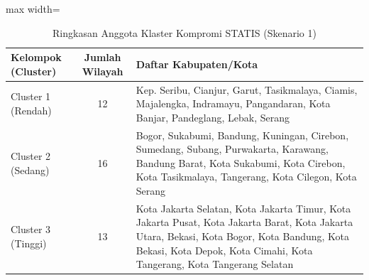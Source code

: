 \begin{table}[H]
\centering
\caption{Ringkasan Anggota Klaster Kompromi STATIS (Skenario 1)} \label{tab:app1compromclust}
\begin{adjustbox}{max width=\textwidth}
\begin{tabular}{|p{3cm}|c|p{10cm}|}
\hline
\textbf{Kelompok (Cluster)} & \textbf{Jumlah Wilayah} & \textbf{Daftar Kabupaten/Kota} \\
\hline
Cluster 1 (Rendah) & 12 & Kep. Seribu, Cianjur, Garut, Tasikmalaya, Ciamis, Majalengka, Indramayu, Pangandaran, Kota Banjar, Pandeglang, Lebak, Serang \\
\hline
Cluster 2 (Sedang) & 16 & Bogor, Sukabumi, Bandung, Kuningan, Cirebon, Sumedang, Subang, Purwakarta, Karawang, Bandung Barat, Kota Sukabumi, Kota Cirebon, Kota Tasikmalaya, Tangerang, Kota Cilegon, Kota Serang \\
\hline
Cluster 3 (Tinggi) & 13 & Kota Jakarta Selatan, Kota Jakarta Timur, Kota Jakarta Pusat, Kota Jakarta Barat, Kota Jakarta Utara, Bekasi, Kota Bogor, Kota Bandung, Kota Bekasi, Kota Depok, Kota Cimahi, Kota Tangerang, Kota Tangerang Selatan \\
\hline
\end{tabular}
\end{adjustbox}
\end{table}
